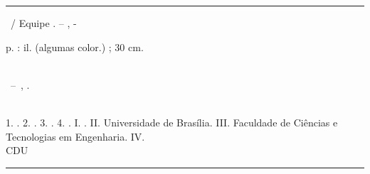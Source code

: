 \begin{fichacatalografica}
	\vspace*{\fill}					%
	\hrule							%
	\begin{center}					%
	\begin{minipage}[c]{12.5cm}		%

	{\raggedright\imprimirautor\par}

	\hspace{0.5cm} \imprimirtitulo~/ Equipe \imprimirequipe. --
	\imprimirlocal, \imprimirdata-

	\hspace{0.5cm} \pageref{LastPage} p. : il. (algumas color.) ; 30 cm.\\

	\hspace{0.5cm} \imprimirorientadorRotulo~\imprimirorientador\\

	\hspace{0.5cm}
	\parbox[t]{\textwidth}{\imprimirtipotrabalho~--~\imprimirinstituicao,
	\imprimirdata.}\\

	\hspace{0.5cm}
		1. \imprimirpalavrachaveum.
		2. \imprimirpalavrachavedois.
		3. \imprimirpalavrachavetres.
		4. \imprimirpalavrachavequatro.
		I. \imprimirorientador.
		II. Universidade de Brasília.
		III. Faculdade de Ciências e Tecnologias em Engenharia.
		IV. \imprimirtitulo\\

	\hspace{8.75cm} CDU \\

	\end{minipage}
	\end{center}
	\hrule
        \pagebreak
\end{fichacatalografica}
